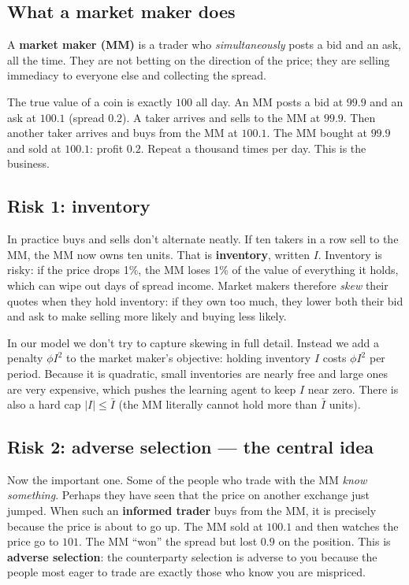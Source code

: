\documentclass[11pt]{article}
\begin{document}
\subsection{What a market maker does}
A \textbf{market maker (MM)} is a trader who \emph{simultaneously} posts a bid and an ask, all the time. They are not betting on the direction of the price; they are selling immediacy to everyone else and collecting the spread.

\begin{example}
The true value of a coin is exactly $100$ all day. An MM posts a bid at $99.9$ and an ask at $100.1$ (spread $0.2$). A taker arrives and sells to the MM at $99.9$. Then another taker arrives and buys from the MM at $100.1$. The MM bought at $99.9$ and sold at $100.1$: profit $0.2$. Repeat a thousand times per day. This is the business.
\end{example}

\subsection{Risk 1: inventory}
In practice buys and sells don't alternate neatly. If ten takers in a row sell to the MM, the MM now owns ten units. That is \textbf{inventory}, written $I$. Inventory is risky: if the price drops 1\%, the MM loses 1\% of the value of everything it holds, which can wipe out days of spread income. Market makers therefore \emph{skew} their quotes when they hold inventory: if they own too much, they lower both their bid and ask to make selling more likely and buying less likely.

In our model we don't try to capture skewing in full detail. Instead we add a penalty $\phi I^2$ to the market maker's objective: holding inventory $I$ costs $\phi I^2$ per period. Because it is quadratic, small inventories are nearly free and large ones are very expensive, which pushes the learning agent to keep $I$ near zero. There is also a hard cap $|I|\le \bar I$ (the MM literally cannot hold more than $\bar I$ units).

\subsection{Risk 2: adverse selection --- the central idea}\label{sec:adverse}
Now the important one. Some of the people who trade with the MM \emph{know something}. Perhaps they have seen that the price on another exchange just jumped. When such an \textbf{informed trader} buys from the MM, it is precisely because the price is about to go up. The MM sold at $100.1$ and then watches the price go to $101$. The MM ``won'' the spread but lost $0.9$ on the position. This is \textbf{adverse selection}: the counterparty selection is adverse to you because the people most eager to trade are exactly those who know you are mispriced.
\end{document}
